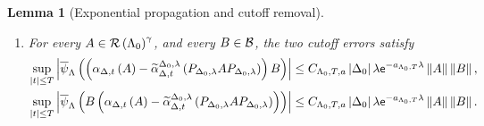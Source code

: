 \documentclass[11pt,a4paper]{article}
\theoremstyle{plain}
\newtheorem{lem}[thm]{Lemma}
\theoremstyle{definition}
\theoremstyle{remark}
\begin{document}
\begin{lem}[Exponential propagation and cutoff removal]
\begin{enumerate}
\item
For every
$A \in \mathcal{R} \left( \Lambda_0 \right)^{\gamma}$, and every $B \in \mathcal{B}$, the two cutoff errors satisfy
\begin{equation}
\begin{aligned}
\sup_{\abs{t} \leq T}
\abs{
\fun{\oastate[\overline{\psi}_{\Lambda}]}{
\rbk{
\fun{\alpha_{\Delta,t}}{A}
-
\fun{\widetilde{\alpha}_{\Delta,t}^{\Delta_0,\lambda}}{P_{\Delta_0,\lambda}AP_{\Delta_0,\lambda}}}B}}
& \leq
C_{\Lambda_0,T,a}\abscard{\Delta_0}\lambda
\napiernum^{-a_{\Lambda_0,T}\lambda}\norm{A}\norm{B},
\\
\sup_{\abs{t} \leq T}
\abs{
\fun{\oastate[\overline{\psi}_{\Lambda}]}{
B\rbk{
\fun{\alpha_{\Delta,t}}{A}
-
\fun{\widetilde{\alpha}_{\Delta,t}^{\Delta_0,\lambda}}{P_{\Delta_0,\lambda}AP_{\Delta_0,\lambda}}}}}
& \leq
C_{\Lambda_0,T,a}\abscard{\Delta_0}\lambda
\napiernum^{-a_{\Lambda_0,T}\lambda}\norm{A}\norm{B}.
\end{aligned}
\label{eq:fock-exponential-cutoff-removal}
\end{equation}
\end{enumerate}
\end{lem}
\end{document}
